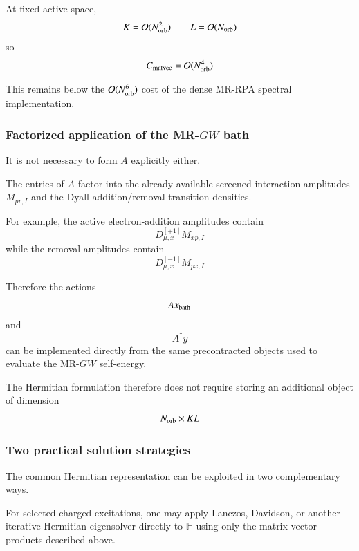 \documentclass[aip,jcp,reprint,noshowkeys,superscriptaddress]{revtex4-1}
\begin{document}
At fixed active space,
\begin{equation}
  K=\mathcal O(N_{\rm orb}^2)
  \qquad
  L=\mathcal O(N_{\rm orb})
\end{equation}
so
\begin{equation}
  C_{\rm matvec}
  =
  \mathcal O(N_{\rm orb}^4)
\end{equation}

This remains below the
$\mathcal O(N_{\rm orb}^6)$ cost of the dense MR-RPA spectral
implementation.


\subsubsection{Factorized application of the MR-$GW$ bath}

It is not necessary to form $A$ explicitly either.

The entries of $A$ factor into the already available screened
interaction amplitudes $M_{pr,I}$ and the Dyall addition/removal
transition densities.

For example, the active electron-addition amplitudes contain
\begin{equation}
  D_{\mu,x}^{[+1]}M_{xp,I}
\end{equation}
while the removal amplitudes contain
\begin{equation}
  D_{\mu,x}^{[-1]}M_{px,I}
\end{equation}

Therefore the actions
\begin{equation}
  Ax_{\rm bath}
\end{equation}
and
\begin{equation}
  A^\dagger y
\end{equation}
can be implemented directly from the same precontracted objects used
to evaluate the MR-$GW$ self-energy.

The Hermitian formulation therefore does not require storing an
additional object of dimension
\begin{equation}
  N_{\rm orb}\times KL
\end{equation}


\subsubsection{Two practical solution strategies}

The common Hermitian representation can be exploited in two
complementary ways.

For selected charged excitations, one may apply Lanczos, Davidson, or
another iterative Hermitian eigensolver directly to $\mathbb H$ using
only the matrix-vector products described above.
\end{document}
